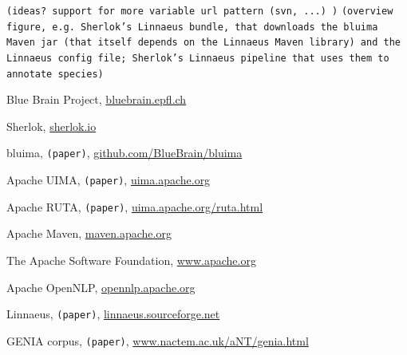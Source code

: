\documentclass{article}
\newcommand{\TODO}[1]{\texttt{\textcolor{YellowOrange}{(#1)}}} %
\begin{document}
\TODO{ideas? support for more variable url pattern (svn, ...) }
\TODO{overview figure, e.g.  Sherlok's Linnaeus bundle, that downloads the bluima Maven jar (that itself depends on the Linnaeus Maven library) and the Linnaeus config file; Sherlok's Linnaeus pipeline that uses them to annotate species}

\begin{thebibliography}{99}

    Blue Brain Project,
    \href{http://bluebrain.epfl.ch/}{bluebrain.epfl.ch}

    Sherlok,
    \href{http://sherlok.io}{sherlok.io}

    bluima,
	\TODO{paper},
    \href{https://github.com/BlueBrain/bluima}{github.com/BlueBrain/bluima}

    Apache UIMA,
	\TODO{paper},
    \href{https://uima.apache.org/}{uima.apache.org}

    Apache RUTA,
	\TODO{paper},
    \href{https://uima.apache.org/ruta.html}{uima.apache.org/ruta.html}

    Apache Maven,
    \href{https://maven.apache.org/}{maven.apache.org}

    The Apache Software Foundation,
    \href{http://www.apache.org/}{www.apache.org}

    Apache OpenNLP,
    \href{https://opennlp.apache.org/}{opennlp.apache.org}

    Linnaeus,
	\TODO{paper},
    \href{http://linnaeus.sourceforge.net/}{linnaeus.sourceforge.net}

    GENIA corpus,
	\TODO{paper},
    \href{http://www.nactem.ac.uk/aNT/genia.html}{www.nactem.ac.uk/aNT/genia.html}


\end{thebibliography}

\begin{appendix}
  \listoffigures
  \listoftables
\end{appendix}
\end{document}
